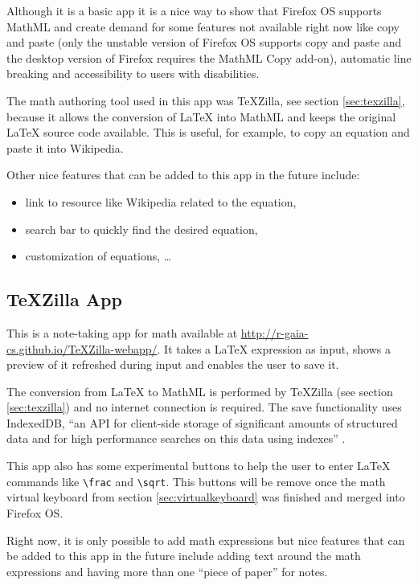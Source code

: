 Although it is a basic app it is a nice way to show that Firefox OS supports
MathML and create demand for some features not available right now like copy and
paste (only the unstable version of Firefox OS supports copy and paste and the
desktop version of Firefox requires the MathML Copy add-on),
automatic line breaking and accessibility to users with disabilities.

The math authoring tool used in this app was TeXZilla, see section
\ref{sec:texzilla}, because it allows the conversion of LaTeX into MathML and
keeps the original LaTeX source code available.
This is useful, for example, to copy an equation
and paste it into Wikipedia.

Other nice features that can be added to this app in the future include:
\begin{itemize}
  \item link to resource like Wikipedia related to the equation,
  \item search bar to quickly find the desired equation,
  \item customization of equations, \ldots
\end{itemize}

\subsection{TeXZilla App}
\label{sec:texzillapp}

This is a note-taking app for math available at
\href{http://r-gaia-cs.github.io/TeXZilla-webapp/}{http://r-gaia-cs.github.io/TeXZilla-webapp/}.
It takes a LaTeX expression as input, shows a preview of it refreshed during
input and enables the user to save it.

The conversion from LaTeX to MathML is performed by TeXZilla
(see section \ref{sec:texzilla})
and no internet connection is required. The save functionality
uses IndexedDB, ``an API for client-side storage of significant amounts of
structured data and for high performance searches on this data using indexes''
 \cite{IndexedDatabaseAPI}.

This app also has some experimental buttons to help the user to enter LaTeX commands like
{\tt \textbackslash frac} and {\tt \textbackslash sqrt}. This buttons will be
remove once the math virtual keyboard from section \ref{sec:virtualkeyboard}
was finished and merged into Firefox OS.

Right now, it is only possible to add math expressions but nice features that can be
added to this app in the future include adding text around the math expressions and
having more than one ``piece of paper'' for notes.

